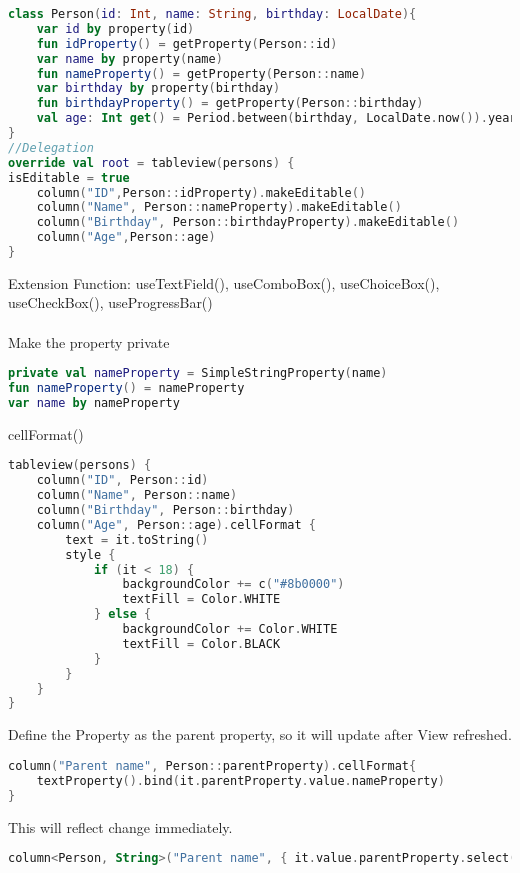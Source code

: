 \documentclass[12pt]{article}
\begin{document}
\begin{lstlisting}[language=Kotlin]
class Person(id: Int, name: String, birthday: LocalDate){
	var id by property(id)
	fun idProperty() = getProperty(Person::id)
	var name by property(name)
	fun nameProperty() = getProperty(Person::name)
	var birthday by property(birthday)
	fun birthdayProperty() = getProperty(Person::birthday)
	val age: Int get() = Period.between(birthday, LocalDate.now()).years
}
//Delegation
override val root = tableview(persons) {
isEditable = true
	column("ID",Person::idProperty).makeEditable()
	column("Name", Person::nameProperty).makeEditable()
	column("Birthday", Person::birthdayProperty).makeEditable()
	column("Age",Person::age)
}
\end{lstlisting}
Extension Function: useTextField(), useComboBox(), useChoiceBox(), useCheckBox(), useProgressBar() 
\\\\
Make the property private 
\begin{lstlisting}[language=Kotlin]
private val nameProperty = SimpleStringProperty(name)
fun nameProperty() = nameProperty
var name by nameProperty
\end{lstlisting}
cellFormat()

\begin{lstlisting}[language=Kotlin]
tableview(persons) {
    column("ID", Person::id)
    column("Name", Person::name)
    column("Birthday", Person::birthday)
    column("Age", Person::age).cellFormat {
        text = it.toString()
        style {
            if (it < 18) {
                backgroundColor += c("#8b0000")
                textFill = Color.WHITE
            } else {
                backgroundColor += Color.WHITE
                textFill = Color.BLACK
            }
        }
    }
}
\end{lstlisting}
Define the Property as the parent property, so it will update after View refreshed.
\begin{lstlisting}[language=Kotlin]
column("Parent name", Person::parentProperty).cellFormat{
    textProperty().bind(it.parentProperty.value.nameProperty)
}
\end{lstlisting}
This will reflect change immediately.
\begin{lstlisting}[language=Kotlin]
column<Person, String>("Parent name", { it.value.parentProperty.select(Person::nameProperty) })
\end{lstlisting}
\end{document}
